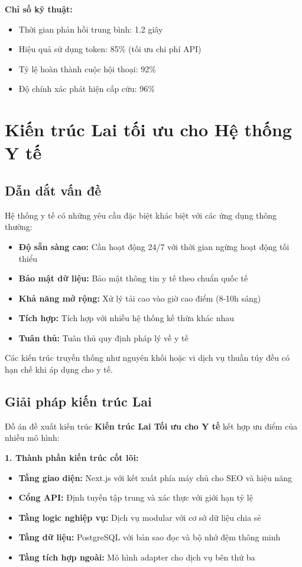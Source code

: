 \documentclass[../DoAn.tex]{subfiles}
\begin{document}
\textbf{Chỉ số kỹ thuật:}
\begin{itemize}
    \item Thời gian phản hồi trung bình: 1.2 giây
    \item Hiệu quả sử dụng token: 85\% (tối ưu chi phí API)
    \item Tỷ lệ hoàn thành cuộc hội thoại: 92\%
    \item Độ chính xác phát hiện cấp cứu: 96\%
\end{itemize}

\section{Kiến trúc Lai tối ưu cho Hệ thống Y tế}
\label{section:5.2}

\subsection{Dẫn dắt vấn đề}

Hệ thống y tế có những yêu cầu đặc biệt khác biệt với các ứng dụng thông thường:
\begin{itemize}
    \item \textbf{Độ sẵn sàng cao:} Cần hoạt động 24/7 với thời gian ngừng hoạt động tối thiểu
    \item \textbf{Bảo mật dữ liệu:} Bảo mật thông tin y tế theo chuẩn quốc tế
    \item \textbf{Khả năng mở rộng:} Xử lý tải cao vào giờ cao điểm (8-10h sáng)
    \item \textbf{Tích hợp:} Tích hợp với nhiều hệ thống kế thừa khác nhau
    \item \textbf{Tuân thủ:} Tuân thủ quy định pháp lý về y tế
\end{itemize}

Các kiến trúc truyền thống như nguyên khối hoặc vi dịch vụ thuần túy đều có hạn chế khi áp dụng cho y tế.

\subsection{Giải pháp kiến trúc Lai}

Đồ án đề xuất kiến trúc \textbf{Kiến trúc Lai Tối ưu cho Y tế} kết hợp ưu điểm của nhiều mô hình:

\textbf{1. Thành phần kiến trúc cốt lõi:}
\begin{itemize}
    \item \textbf{Tầng giao diện:} Next.js với kết xuất phía máy chủ cho SEO và hiệu năng
    \item \textbf{Cổng API:} Định tuyến tập trung và xác thực với giới hạn tỷ lệ
    \item \textbf{Tầng logic nghiệp vụ:} Dịch vụ modular với cơ sở dữ liệu chia sẻ
    \item \textbf{Tầng dữ liệu:} PostgreSQL với bản sao đọc và bộ nhớ đệm thông minh
    \item \textbf{Tầng tích hợp ngoài:} Mô hình adapter cho dịch vụ bên thứ ba
\end{itemize}
\end{document}
